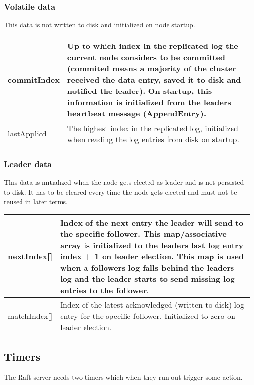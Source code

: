 \subsubsection*{Volatile data}

This data is not written to disk and initialized on node startup.

\begin{tabular}{ | l | p{13.7cm} | }
\hline
commitIndex & Up to which index in the replicated log the current node considers to be committed (commited means a majority of the cluster
received the data entry, saved it to disk and notified the leader). On startup, this information is initialized from the leaders heartbeat message (AppendEntry). \\ \hline
lastApplied & The highest index in the replicated log, initialized when reading the log entries from disk on startup. \\ \hline
\end{tabular}

\subsubsection*{Leader data}

This data is initialized when the node gets elected as leader and is not persisted to disk.
It has to be cleared every time the node gets elected and must not be reused in later terms.

\begin{tabular}{ | l | p{13.7cm} | }
\hline
nextIndex[] & Index of the next entry the leader will send to the specific follower. This map/associative array is initialized to the leaders last log entry index + 1 on leader election.
This map is used when a followers log falls behind the leaders log and the leader starts to send missing log entries to the follower. \\ \hline
matchIndex[] & Index of the latest acknowledged (written to disk) log entry for the specific follower. Initialized to zero on leader election. \\ \hline
\end{tabular}








\subsection{Timers}
The Raft server needs two timers which when they run out trigger some action.

